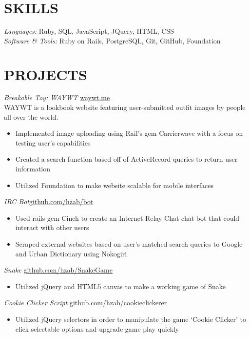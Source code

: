 \documentclass[margin]{res}
\begin{document}
\begin{resume}
 
 
\section{SKILLS} {\sl Languages:} Ruby, SQL, JavaScript, JQuery, HTML, CSS \\
	       {\sl Software \& Tools:} Ruby on Rails, PostgreSQL, Git, GitHub, Foundation \\

\section{PROJECTS} {\sl Breakable Toy: WAYWT } \hfill \href{http://www.waywt.me}{waywt.me} \\
                WAYWT is a lookbook website featuring user-submitted outfit images by people all over the world.
                 \begin{itemize}  \itemsep -2pt %
                 \item Implemented image uploading using Rail’s gem Carrierwave with a focus on testing user’s capabilities
                \item Created a search function based off of ActiveRecord queries to return user information
		\item Utilized Foundation to make website scalable for mobile interfaces
                \end{itemize}

 		{\sl IRC Bot}\hfill \href{https://github.com/hzab/bot}{github.com/hzab/bot} 
                 \begin{itemize}  \itemsep -2pt %
                 \item Used rails gem Cinch to create an Internet Relay Chat chat bot that could interact with other users
                \item Scraped external websites based on user’s matched search queries to Google and Urban Dictionary using Nokogiri
		\end{itemize}

 
                {\sl Snake} \hfill            \href{https://github.com/hzab/SnakeGame}{github.com/hzab/SnakeGame}
                 \begin{itemize}  \itemsep -2pt %
                 \item Utilized jQuery and HTML5 canvas to make a working game of Snake
                 \end{itemize}
                 {\sl Cookie Clicker Script} \hfill            \href{https://github.com/hzab/cookie_clickerer}{github.com/hzab/cookieclickerer}
                 \begin{itemize}  \itemsep -2pt %
                 \item Utilized jQuery selectors in order to manipulate the game ‘Cookie Clicker’ to click selectable options and upgrade game play quickly
                 \end{itemize}


\end{resume}
\end{document}
